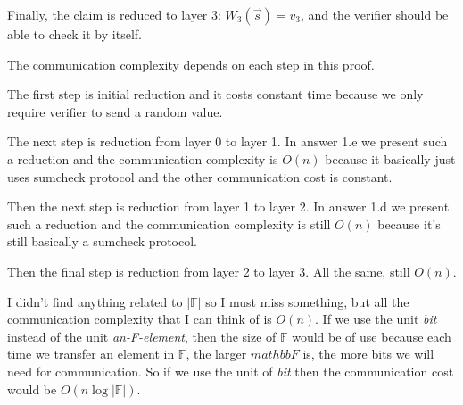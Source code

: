 \documentclass[12pt]{article}
\newenvironment{sol}[1][Solution]{\begin{trivlist}
\item[\hskip \labelsep {\bfseries #1:}]}{\end{trivlist}}
\begin{document}
\begin{sol}
    Finally, the claim is reduced to layer 3: $W_3(\vec{s}) = v_3$, and the verifier should be able to check it by itself.

    The communication complexity depends on each step in this proof.

    The first step is initial reduction and it costs constant time because we only require verifier to send a random value.

    The next step is reduction from layer 0 to layer 1. In answer 1.e we present such a reduction and the communication complexity is $O(n)$ because it basically just uses sumcheck protocol and the other communication cost is constant.

    Then the next step is reduction from layer 1 to layer 2. In answer 1.d we present such a reduction and the communication complexity is still $O(n)$ because it's still basically a sumcheck protocol.

    Then the final step is reduction from layer 2 to layer 3. All the same, still $O(n)$.

    I didn't find anything related to $|\mathbb{F}|$ so I must miss something, but all the communication complexity that I can think of is $O(n)$. If we use the unit \textit{bit} instead of the unit \textit{an-F-element}, then the size of $\mathbb{F}$ would be of use because each time we transfer an element in $\mathbb{F}$, the larger $mathbb{F}$ is, the more bits we will need for communication. So if we use the unit of \textit{bit} then the communication cost would be $O(n\log |\mathbb{F}|)$.

\end{sol}


\end{document}
